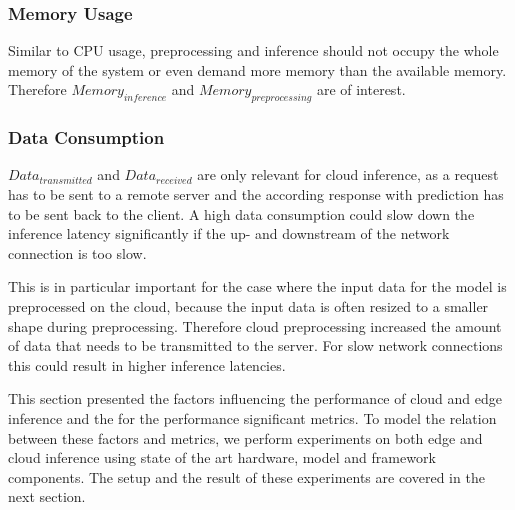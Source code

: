 \subsubsection{Memory Usage}
Similar to CPU usage, preprocessing and inference should not occupy the whole memory of the system or even demand more memory than the available memory. Therefore $Memory_{inference}$ and $Memory_{preprocessing}$ are of interest.

\subsubsection{Data Consumption}
$Data_{transmitted}$ and $Data_{received}$ are only relevant for cloud inference, as a request has to be sent to a remote server and the according response with prediction has to be sent back to the client. A high data consumption could slow down the inference latency significantly if the up- and downstream of the network connection is too slow. 

This is in particular important for the case where the input data for the model is preprocessed on the cloud, because the input data is often resized to a smaller shape during preprocessing. Therefore cloud preprocessing increased the amount of data that needs to be transmitted to the server. For slow network connections this could result in higher inference latencies.




This section presented the factors influencing the performance of cloud and edge inference and the for the performance significant metrics.
To model the relation between these factors and metrics, we perform experiments on both edge and cloud inference using state of the art hardware, model and framework components. The setup and the result of these experiments are covered in the next section.
\endinput 